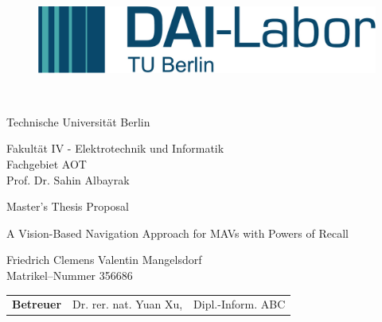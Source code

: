 \thispagestyle{empty}
\begin{figure}[htbp]
	\centering
 \begin{minipage}[b]{41 mm}
   \includegraphics[width=40 mm]{figures/DAI_Logo.png}
 \end{minipage}
\end{figure}

~\vspace{0.5cm}

\begin{center}
\begin{Huge}
Technische Universität Berlin\\
\vspace{1mm}
\end{Huge}{\Large Fakultät IV - Elektrotechnik und Informatik\\
Fachgebiet AOT\\
Prof. Dr. Sahin Albayrak}\\

\vspace{26mm}
\begin{LARGE}
Master's Thesis Proposal\\
\end{LARGE}
\vspace{8mm}
\begin{LARGE}
A Vision-Based Navigation Approach for MAVs with Powers of Recall\\
\end{LARGE}
\vspace{3 cm}
Friedrich Clemens Valentin Mangelsdorf\\
Matrikel--Nummer 356686\\
\vspace{1cm}
\begin{tabular}{lll}
\textbf{Betreuer} & Dr. rer. nat. Yuan Xu, & Dipl.-Inform. ABC\\
\end{tabular}

\end{center}

